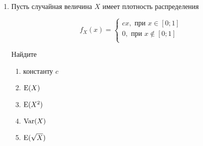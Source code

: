 \begin{enumerate}
\item Пусть случайная величина $X$ имеет плотность распределения

\[
f_X(x) =
	\begin{cases}
	cx,\text{ при }  x \in [0; 1] \\
	0,\text{ при } x \notin  [0; 1] \\
	\end{cases}
\]

Найдите
\begin{enumerate}
	\item константу $c$
	\item $\operatorname{E}(X)$
	\item $\operatorname{E}(X^2)$
	\item $\operatorname{Var}(X)$
	\item $\operatorname{E}(\sqrt{X})$
\end{enumerate}
\end{enumerate}
